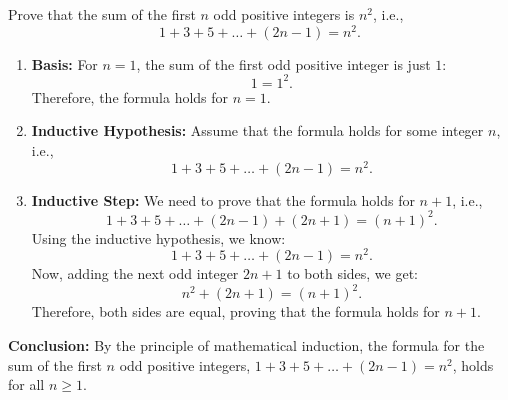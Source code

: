     \begin{example}
        Prove that the sum of the first \( n \) odd positive integers is \( n^2 \), i.e.,
        \[
        1 + 3 + 5 + \dots + (2n-1) = n^2.
        \]

        \begin{enumerate}
            \item \textbf{Basis:} 
            For \( n = 1 \), the sum of the first odd positive integer is just \( 1 \):
            \[
            1 = 1^2.
            \]
            Therefore, the formula holds for \( n = 1 \).
            
            \item \textbf{Inductive Hypothesis:} 
            Assume that the formula holds for some integer \( n \), i.e.,
            \[
            1 + 3 + 5 + \dots + (2n-1) = n^2.
            \]
            
            \item \textbf{Inductive Step:} 
            We need to prove that the formula holds for \( n+1 \), i.e., 
            \[
            \boxed{1 + 3 + 5 + \dots + (2n-1)} + (2n+1) = (n+1)^2.
            \]
            Using the inductive hypothesis, we know:
            \[
            1 + 3 + 5 + \dots + (2n-1) = n^2.
            \]
            Now, adding the next odd integer \( 2n + 1 \) to both sides, we get:
            \[
            n^2 + (2n + 1) = (n+1)^2.
            \]
            Therefore, both sides are equal, proving that the formula holds for \( n+1 \).

        \end{enumerate}

        \textbf{Conclusion:} By the principle of mathematical induction, the formula for the sum of the first \( n \) odd positive integers, \( 1 + 3 + 5 + \dots + (2n-1) = n^2 \), holds for all \( n \geq 1 \).
    \end{example}

